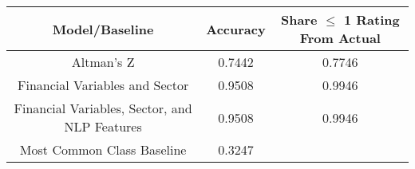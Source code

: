 \footnotesize
\begin{tabular}{ccc}
\toprule
Model/Baseline & Accuracy & Share $\le$ 1 Rating From Actual \\
\midrule
Altman's Z & 0.7442 & 0.7746 \\
Financial Variables and Sector & 0.9508 & 0.9946 \\
Financial Variables, Sector, and NLP Features & 0.9508 & 0.9946 \\
Most Common Class Baseline & 0.3247 &  \\
\bottomrule
\end{tabular}

\normalsize